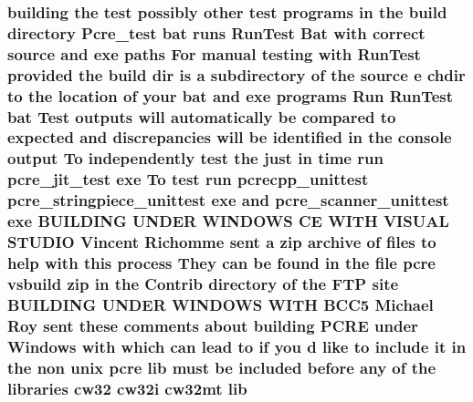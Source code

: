 \subsubsection[{\texorpdfstring{lib}{lib}}]{\setlength{\rightskip}{0pt plus 5cm}building the test possibly other test programs {\bf in} the build {\bf directory} Pcre\+\_\+test {\bf bat} runs Run\+Test Bat {\bf with} correct {\bf source} and {\bf exe} paths For manual testing {\bf with} Run\+Test provided the build {\bf dir} {\bf is} {\bf a} subdirectory {\bf of} the {\bf source} {\bf e} chdir {\bf to} the {\bf location} {\bf of} your {\bf bat} and {\bf exe} programs Run Run\+Test {\bf bat} Test outputs will automatically {\bf be} compared {\bf to} {\bf expected} and discrepancies will {\bf be} identified {\bf in} the console {\bf output} To independently test the just {\bf in} {\bf time} {\bf run} pcre\+\_\+jit\+\_\+test {\bf exe} To test {\bf run} pcrecpp\+\_\+unittest pcre\+\_\+stringpiece\+\_\+unittest {\bf exe} and pcre\+\_\+scanner\+\_\+unittest {\bf exe} B\+U\+I\+L\+D\+I\+NG U\+N\+D\+ER W\+I\+N\+D\+O\+WS CE W\+I\+TH V\+I\+S\+U\+AL S\+T\+U\+D\+IO Vincent Richomme {\bf sent} {\bf a} zip archive {\bf of} {\bf files} {\bf to} help {\bf with} {\bf this} {\bf process} They {\bf can} {\bf be} {\bf found} {\bf in} the {\bf file} {\bf pcre} vsbuild zip {\bf in} the Contrib {\bf directory} {\bf of} the F\+TP {\bf site} B\+U\+I\+L\+D\+I\+NG U\+N\+D\+ER W\+I\+N\+D\+O\+WS W\+I\+TH {\bf B\+C\+C5} Michael Roy {\bf sent} these comments about building {\bf P\+C\+RE} under {\bf Windows} {\bf with} {\bf which} {\bf can} lead {\bf to} {\bf if} you {\bf d} like {\bf to} {\bf include} {\bf it} {\bf in} the non unix {\bf pcre} lib must {\bf be} {\bf included} before {\bf any} {\bf of} the {\bf libraries} cw32 cw32i cw32mt lib}\hypertarget{NON-AUTOTOOLS-BUILD_8txt_a25bfb1181d9fef7e40e828a146838ff6}{}\label{NON-AUTOTOOLS-BUILD_8txt_a25bfb1181d9fef7e40e828a146838ff6}
